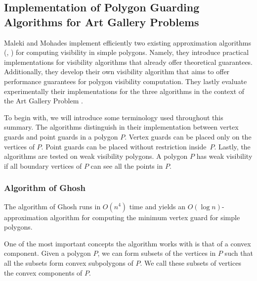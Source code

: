 \subsection[Implementation of Guarding Algorithms]{Implementation of Polygon Guarding Algorithms for Art Gallery Problems}
Maleki and Mohades \cite{maleki2022implementation} implement efficiently two existing approximation algorithms (\cite{GHOSH2010718}, \cite{bhattacharya2016approximability}) for computing visibility in simple polygons. Namely, they introduce practical implementations for visibility algorithms that already offer theoretical guarantees. Additionally, they develop their own visibility algorithm that aims to offer performance guarantees for polygon visibility computation. They lastly  evaluate experimentally their implementations for the three algorithms in the context of the Art Gallery Problem \cite{o1987art}.

To begin with, we will introduce some terminology used throughout this summary. The algorithms distinguish in their implementation between vertex guards and point guards in  a polygon $P$. Vertex guards can be placed only on the vertices of $P$. Point guards can be placed without restriction inside~$P$. Lastly, the algorithms are tested on weak visibility polygons. A polygon $P$ has weak visibility if all boundary vertices of $P$ can see all the points in $P$.


\subsubsection{Algorithm of Ghosh}
The algorithm of Ghosh \cite{GHOSH2010718} runs in $O(n^4)$ time and yields an $O(\log n)$-approximation algorithm for computing the minimum vertex guard for simple polygons. 

One of the most important concepts the algorithm works with is that of a convex component. Given a polygon $P$, we can form subsets of the vertices in $P$ such that all the subsets form convex subpolygons of $P$. We call these subsets of vertices the convex components of $P$.

